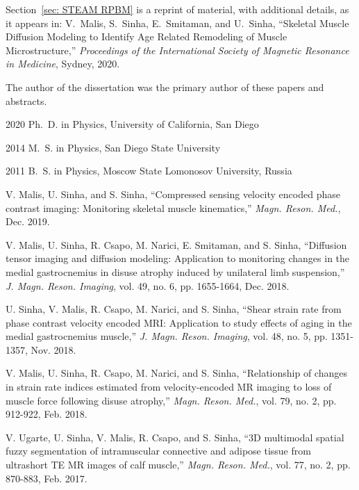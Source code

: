 \begin{frontmatter}
\begin{acknowledgements}
Section~\ref{sec: STEAM RPBM} is a reprint of material, with additional details, as it appears in: V.~Malis, S.~Sinha, E.~Smitaman, and U.~Sinha, ``Skeletal Muscle Diffusion Modeling to Identify Age Related Remodeling of Muscle Microstructure,'' \emph{Proceedings of the International Society of Magnetic Resonance in Medicine}, Sydney, 2020.

The author of the dissertation was the primary author of these papers and abstracts.
\end{acknowledgements}


%
%
\begin{vitapage}
\begin{vita}
  \item[2020] Ph.~D. in Physics, University of California, San Diego
  \item[2014] M.~S. in Physics, San Diego State University
  \item[2011] B.~S. in Physics, Moscow State Lomonosov University, Russia
  \end{vita}
\begin{publications}
  \item   V. Malis, U. Sinha, and S. Sinha, ``Compressed sensing velocity encoded phase contrast imaging: Monitoring skeletal muscle kinematics,'' \emph{Magn. Reson. Med.}, Dec. 2019.
  \item V. Malis, U. Sinha, R. Csapo, M. Narici, E. Smitaman, and S. Sinha, ``Diffusion tensor imaging and diffusion modeling: Application to monitoring changes in the medial gastrocnemius in disuse atrophy induced by unilateral limb suspension,'' \emph{J. Magn. Reson. Imaging}, vol. 49, no. 6, pp. 1655-1664, Dec. 2018.
  \item U. Sinha, V. Malis, R. Csapo, M. Narici, and S. Sinha, ``Shear strain rate from phase contrast velocity encoded MRI: Application to study effects of aging in the medial gastrocnemius muscle,'' \emph{J. Magn. Reson. Imaging}, vol. 48, no. 5, pp. 1351-1357, Nov. 2018.
  \item	V. Malis, U. Sinha, R. Csapo, M. Narici, and S. Sinha, ``Relationship of changes in strain rate indices estimated from velocity-encoded MR imaging to loss of muscle force following disuse atrophy,'' \emph{Magn. Reson. Med.}, vol. 79, no. 2, pp. 912-922, Feb. 2018.
  \item	V. Ugarte, U. Sinha, V. Malis, R. Csapo, and S. Sinha, ``3D multimodal spatial fuzzy segmentation of intramuscular connective and adipose tissue from ultrashort TE MR images of calf muscle,'' \emph{Magn. Reson. Med.}, vol. 77, no. 2, pp. 870-883, Feb. 2017.

\end{publications}
\end{vitapage}
\end{frontmatter}
